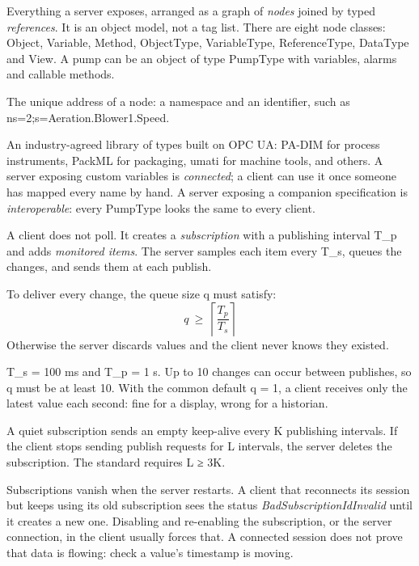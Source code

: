  Everything a server exposes, arranged as a graph of \emph{nodes} joined by typed \emph{references}. It is an object model, not a tag list. There are eight node classes: Object, Variable, Method, ObjectType, VariableType, ReferenceType, DataType and View. A pump can be an object of type PumpType with variables, alarms and callable methods.

 The unique address of a node: a namespace and an identifier, such as ns=2;s=Aeration.Blower1.Speed.

 An industry-agreed library of types built on OPC UA: PA-DIM for process instruments, PackML for packaging, umati for machine tools, and others. A server exposing custom variables is \emph{connected}; a client can use it once someone has mapped every name by hand. A server exposing a companion specification is \emph{interoperable}: every PumpType looks the same to every client.

A client does not poll. It creates a \emph{subscription} with a publishing interval T\_p and adds \emph{monitored items}. The server samples each item every T\_s, queues the changes, and sends them at each publish.

 To deliver every change, the queue size q must satisfy:
\[ q \ \ge\ \left\lceil \frac{T_p}{T_s} \right\rceil \]
Otherwise the server discards values and the client never knows they existed.

 T\_s = 100 ms and T\_p = 1 s. Up to 10 changes can occur between publishes, so q must be at least 10. With the common default q = 1, a client receives only the latest value each second: fine for a display, wrong for a historian.

 A quiet subscription sends an empty keep-alive every K publishing intervals. If the client stops sending publish requests for L intervals, the server deletes the subscription. The standard requires L ≥ 3K.

\onsite Subscriptions vanish when the server restarts. A client that reconnects its session but keeps using its old subscription sees the status \emph{BadSubscriptionIdInvalid} until it creates a new one. Disabling and re-enabling the subscription, or the server connection, in the client usually forces that. A connected session does not prove that data is flowing: check a value's timestamp is moving.

